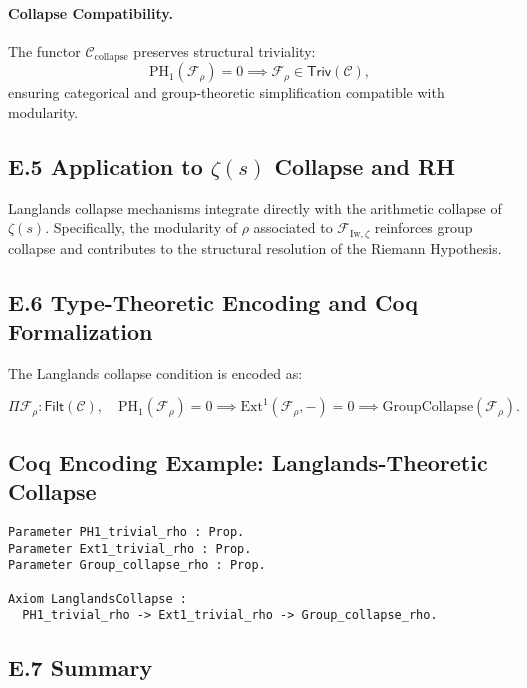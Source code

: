 \documentclass[11pt]{article}
\begin{document}
\paragraph{Collapse Compatibility.}  
The functor $\mathcal{C}_{\mathrm{collapse}}$ preserves structural triviality:
\[
\mathrm{PH}_1(\mathcal{F}_\rho) = 0 \implies \mathcal{F}_\rho \in \mathsf{Triv}(\mathcal{C}),
\]
ensuring categorical and group-theoretic simplification compatible with modularity.

\subsection*{E.5 Application to $\zeta(s)$ Collapse and RH}

Langlands collapse mechanisms integrate directly with the arithmetic collapse of $\zeta(s)$. Specifically, the modularity of $\rho$ associated to $\mathcal{F}_{\mathrm{Iw}, \zeta}$ reinforces group collapse and contributes to the structural resolution of the Riemann Hypothesis.

\subsection*{E.6 Type-Theoretic Encoding and Coq Formalization}

The Langlands collapse condition is encoded as:

\[
\Pi \mathcal{F}_\rho : \mathsf{Filt}(\mathcal{C}), \quad 
\mathrm{PH}_1(\mathcal{F}_\rho) = 0 \implies 
\mathrm{Ext}^1(\mathcal{F}_\rho, -) = 0 \implies 
\mathrm{GroupCollapse}(\mathcal{F}_\rho).
\]

\subsection*{Coq Encoding Example: Langlands-Theoretic Collapse}

\begin{lstlisting}[language=Coq, caption=Coq Formalization of Langlands-Theoretic Collapse, captionpos=b]
Parameter PH1_trivial_rho : Prop.
Parameter Ext1_trivial_rho : Prop.
Parameter Group_collapse_rho : Prop.

Axiom LanglandsCollapse :
  PH1_trivial_rho -> Ext1_trivial_rho -> Group_collapse_rho.
\end{lstlisting}

\subsection*{E.7 Summary}
\end{document}
